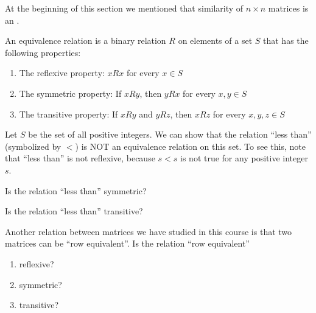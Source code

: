 \documentclass{ximera}
\begin{document}
\begin{problem}\label{prob:lessthan}
At the beginning of this section we mentioned that similarity of $n \times n$ matrices is an .

An equivalence relation is a binary relation $R$ on elements of a set $S$ that has the following properties:
\begin{enumerate}
\item The reflexive property:  $x R x$ for every $x \in S$
\item The symmetric property:  If $x R y$, then $y R x$ for every $x,y \in S$
\item The transitive property:  If $x R y$ and $y R z$, then $x R z$ for every $x,y,z \in S$
\end{enumerate}

Let $S$ be the set of all positive integers.  We can show that the relation ``less than'' (symbolized by $<$) is NOT an equivalence relation on this set.  To see this, note that ``less than'' is not reflexive, because $s<s$ is not true for any positive integer $s$.

\begin{problem}
Is the relation ``less than'' symmetric?
\end{problem}

\begin{problem}
Is the relation ``less than'' transitive?
\end{problem}

\begin{problem}
Another relation between matrices we have studied in this course is that two matrices can be ``row equivalent''.  Is the relation ``row equivalent'' 
\begin{enumerate}
    \item reflexive? 
    \item symmetric? 
    \item transitive? 
\end{enumerate}

\end{problem}

\end{problem}
\end{document}
